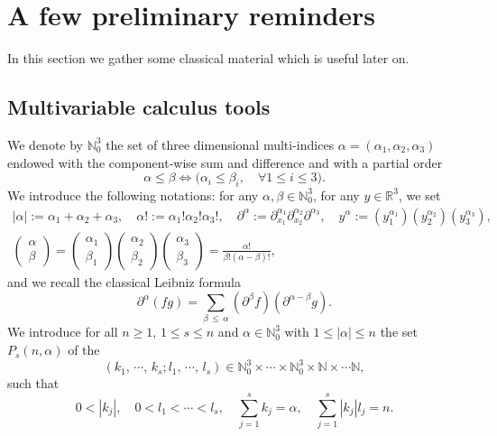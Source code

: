 \documentclass[AHL,Unicode,longabstracts,published]{cedram}
\newcommand{\R}{\mathbb{R}}
\newcommand{\N}{\mathbb{N}}
\renewcommand{\leq}{\leqslant}
\renewcommand{\geq}{\geqslant}
\let\oldforall\forall
\renewcommand*{\forall}{\mathrel{\oldforall}}
\begin{document}
\section{A few preliminary reminders}

In this section we gather some classical material which is useful later on.

\subsection{Multivariable calculus tools}

We denote by $\N_0^3$ the set of three dimensional multi-indices $\alpha=(\alpha_1,\alpha_2,\alpha_3)$ endowed with the component-wise sum and difference and with a partial order
\[
\alpha \leq \beta \Leftrightarrow \Big(\alpha_i \leq \beta_i,\quad \forall 1 \leq i \leq 3 \Big).
\]
We introduce the following notations: for any $\alpha,\beta \in \N_0^3$, for any $y\in\R^3$, we set
\begin{gather*}
|\alpha|:= \alpha_1+\alpha_2+\alpha_3,\quad
\alpha! := \alpha_1! \alpha_2!\alpha_3!,\quad
\partial^\alpha :=\partial_{x_1}^{\alpha_1}\partial_{x_2}^{\alpha_2} \partial^{\alpha_3},\quad y^\alpha :=\left(y_1^{\alpha_1}\right) \left(y_2^{\alpha_2} \right) \left(y_3^{\alpha_3}\right),\\
\begin{pmatrix}
\alpha \\
\beta
\end{pmatrix}=
\begin{pmatrix}
\alpha_1 \\
\beta_1
\end{pmatrix}
\begin{pmatrix}
\alpha_2 \\
\beta_2
\end{pmatrix}
\begin{pmatrix}
\alpha_3 \\
\beta_3
\end{pmatrix}= \frac{\alpha!}{\beta!(\alpha-\beta)!},
\end{gather*}
and we recall the classical Leibniz formula
\[
\partial^\alpha (fg) = \underset{\beta\,\leq\,\alpha}{\sum} \left(\partial^\beta f\right) \left(\partial^{\alpha-\beta} g\right).
\]
We introduce for all $n\geq1$, $1\leq s \leq n$ and $\alpha \in \N_0^3$ with $1 \leq |\alpha|\leq n$ the set $P_s(n,\alpha)$ of the
\[
(k_1,\,\cdots,\,k_s;l_1,\,\cdots,\,l_s)\in \N_0^3\times \cdots\times \N_0^3 \times \N \times \cdots \N,
\]
such that
\[
0<|k_j|,\quad 0<l_1<\cdots<l_s,\quad \underset{j=1}{\overset{s}{\sum}}k_j=\alpha,\quad \underset{j=1}{\overset{s}{\sum}}|k_j| l_j=n.
\]
\end{document}
